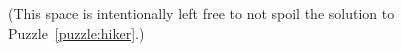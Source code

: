 \documentclass{theoretics}
\begin{document}










\vfill
\begin{center}
  (This space is intentionally left free to not spoil the solution to Puzzle~\ref{puzzle:hiker}.)
\end{center}
\vfill
\clearpage
\end{document}
